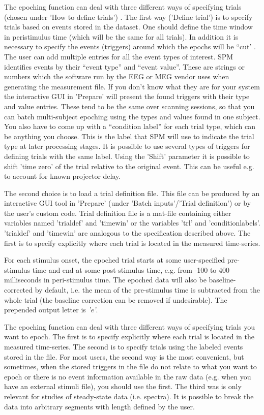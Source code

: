 The epoching function can deal with three different ways of specifying trials (chosen under 'How to define trials') . The first way ('Define trial') is to specify trials based on events stored in the dataset. One should define the time window in peristimulus time (which will be the same for all trials). In addition it is necessary to specify the events (triggers) around which the epochs will be ``cut' . The user can add multiple entries for all the event types of interest. SPM identifies events by their ``event type'' and ``event value''. These are strings or numbers which the software run by the EEG or MEG vendor uses when generating the measurement file. If you don't know what they are for your system the interactive GUI in 'Prepare' will present the found triggers with their type and value entries. These tend to be the same over scanning sessions, so that you can batch multi-subject epoching using the types and values found in one subject. You also have to come up with a ``condition label'' for each trial type, which can be anything you choose. This is the label that SPM will use to indicate the trial type at later processing stages. It is possible to use several types of triggers for defining trials with the same label. Using the 'Shift' parameter it is possible to shift 'time zero' of the trial relative to the original event. This can be useful e.g. to account for known projector delay. 

The second choice is to load a trial definition file. This file can be produced by an interactive GUI tool in 'Prepare' (under 'Batch inputs'/'Trial definition') or by the user's custom code.  Trial definition file is a mat-file containing either variables named 'trialdef' and 'timewin' or the variables 'trl' and 'conditionlabels'.  'trialdef' and 'timewin' are analogous to the specification described above. The first is to specify explicitly where each trial is located in the measured time-series. 


For each stimulus onset, the epoched trial starts at some user-specified pre-stimulus time and end at some post-stimulus time, e.g. from -100 to 400 milliseconds in peri-stimulus time. The epoched data will also be baseline-corrected by default, i.e. the mean of the pre-stimulus time is subtracted from the whole trial (the baseline correction can be removed if undesirable).  The prepended output letter is \textit{'e'}.

The epoching function can deal with three different ways of specifying trials you want to epoch. The first is to specify explicitly where each trial is located in the measured time-series. The second is to specify trials using the labeled events stored in the file. For most users, the second way is the most convenient, but sometimes, when the stored triggers in the file do not relate to what you want to epoch or there is no event information available in the raw data (e.g. when you have an external stimuli file), you should use the first. The third was is only relevant for studies of steady-state data (i.e. spectra). It is possible to break the data into arbitrary segments with length defined by the user. 

